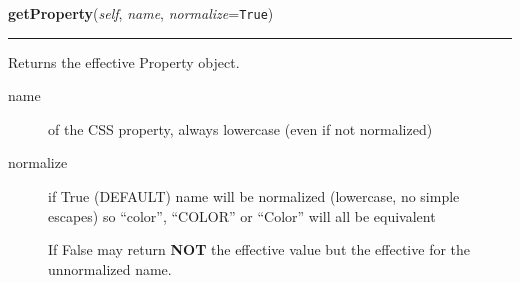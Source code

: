 \hspace{.8\funcindent}\begin{boxedminipage}{\funcwidth}

    \raggedright \textbf{getProperty}(\textit{self}, \textit{name}, \textit{normalize}={\tt True})

    \vspace{-1.5ex}

    \rule{\textwidth}{0.5\fboxrule}
\setlength{\parskip}{2ex}

Returns the effective Property object.
\begin{description}
\item[{name}] \leavevmode 
of the CSS property, always lowercase (even if not normalized)

\item[{normalize}] \leavevmode 
if True (DEFAULT) name will be normalized (lowercase, no simple
escapes) so ``color'', ``COLOR'' or ``Color'' will all be equivalent

If False may return \textbf{NOT} the effective value but the effective
for the unnormalized name.

\end{description}
\setlength{\parskip}{1ex}
    \end{boxedminipage}

    \label{cssutils:css:cssstyledeclaration:CSSStyleDeclaration:getPropertyCSSValue}

    \vspace{0.5ex}

